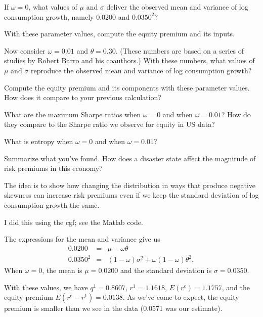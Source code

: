 \documentclass[11pt]{exam}
\begin{document}
\begin{questions}
\begin{parts}
\item If $\omega = 0$, what values of $\mu$ and $\sigma$ deliver
the observed mean and variance of log consumption growth, namely
0.0200 and $0.0350^2$?

\item With these parameter values, compute the equity premium and its inputs.

\item Now consider $\omega = 0.01$ and $\theta = 0.30$.
(These numbers are based on a series of studies by Robert Barro and his coauthors.)
With these numbers, what values of $\mu$ and $\sigma$ reproduce
the observed mean and variance of log consumption growth?

\item Compute the equity premium and its components
with these parameter values.
How does it compare to your previous calculation?

\item
What are the maximum Sharpe ratios when $\omega = 0$ and when $\omega = 0.01$?
How do they compare to the Sharpe ratio we observe for equity in US data?

\item
What is entropy when $\omega = 0$ and when $\omega = 0.01$?

\item Summarize what you've found.
How does a disaster state affect the magnitude of risk premiums
in this economy?
\end{parts}

\begin{solution}
The idea is to show how changing the distribution
in ways that produce negative skewness can increase risk
premiums even if we keep the standard deviation of log consumption
growth the same.

\begin{parts}
\item I did this using the cgf; see the Matlab code.

\item The expressions for the mean and variance give us
\begin{eqnarray*}
    0.0200  &=&  \mu - \omega \theta  \\
    0.0350^2 &=& (1-\omega) \sigma^2 + \omega (1-\omega) \theta^2 ,
\end{eqnarray*}
When $\omega = 0$, the mean is $\mu = 0.0200$ and the standard
deviation is $\sigma = 0.0350$.

\item With these values, we have
$q^1 = 0.8607$, $r^1 = 1.1618$,
$ E(r^e) = 1.1757$,
and the equity premium $ E(r^e-r^1) = 0.0138$.
As we've come to expect, the equity premium is smaller than we see in the data
(0.0571 was our estimate).


\end{parts}
\end{solution}
\end{questions}
\end{document}
